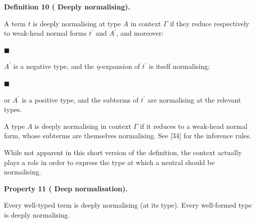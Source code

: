 \documentclass[10pt,a4paper]{amsart}
\begin{document}
\par\medskip\noindent\textbf{Definition 10 (  Deeply normalising).}\par
 
 
A term $t$ is deeply normalising at type $A$ in context $\Gamma$ if they reduce respectively to weak-head normal forms $t^{\prime}$ and $A^{\prime}$, and moreover:\par
  
\par\noindent  $\blacksquare$ 
 
$A^{\prime}$ is a negative type, and the $\eta$-expansion of $t^{\prime}$ is itself normalising;\par
 
 
 
\par\noindent  $\blacksquare$ 
 
or $A^{\prime}$ is a positive type, and the subterms of $t^{\prime}$ are normalising at the relevant types.\par
 
 
  
A type $A$ is deeply normalising in context $\Gamma$ if it reduces to a weak-head normal form, whose subterms are themselves normalising. See [34] for the inference rules.\par
 
 
 
 
While not apparent in this short version of the definition, the context actually plays a role in order to express the type at which a neutral should be normalising.\par
 
 
 
\par\medskip\noindent\textbf{Property 11 (  Deep normalisation).}\par
 
 
Every well-typed term is deeply normalising (at its type). Every well-formed type is deeply normalising.\par
 
 
\end{document}
